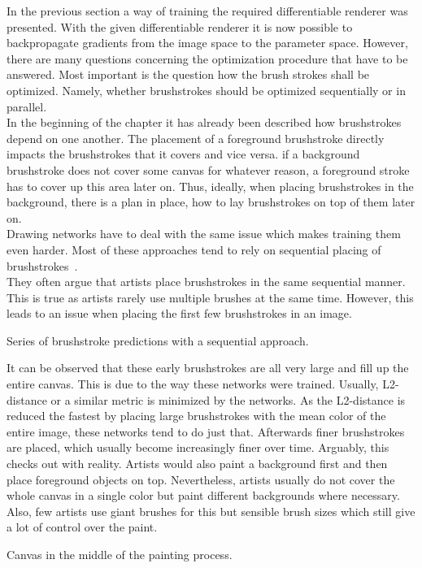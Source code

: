 In the previous section a way of training the required differentiable renderer was presented.
With the given differentiable renderer it is now possible to backpropagate gradients from the image space to the parameter space.
However, there are many questions concerning the optimization procedure that have to be answered.
Most important is the question how the brush strokes shall be optimized.
Namely, whether brushstrokes should be optimized sequentially or in parallel.\\
In the beginning of the chapter it has already been described how brushstrokes depend on one another.
The placement of a foreground brushstroke directly impacts the brushstrokes that it covers and vice versa.
\eg if a background brushstroke does not cover some canvas for whatever reason, a foreground stroke has to cover up this area later on.
Thus, ideally, when placing brushstrokes in the background, there is a plan in place, how to lay brushstrokes on top of them later on.\\
Drawing networks have to deal with the same issue which makes training them even harder.
Most of these approaches tend to rely on sequential placing of brushstrokes~\cite{SPIRAL, strokenet, learning2paint, neuralpainters, hertzmann}.\\
They often argue that artists place brushstrokes in the same sequential manner.
This is true as artists rarely use multiple brushes at the same time.
However, this leads to an issue when placing the first few brushstrokes in an image.\\
\begin{marginfigure}
    \caption{Series of brushstroke predictions with a sequential approach.}
\end{marginfigure}
It can be observed that these early brushstrokes are all very large and fill up the entire canvas.
This is due to the way these networks were trained.
Usually, L2-distance or a similar metric is minimized by the networks.
As the L2-distance is reduced the fastest by placing large brushstrokes with the mean color of the entire image, these networks tend to do just that.
Afterwards finer brushstrokes are placed, which usually become increasingly finer over time.
Arguably, this checks out with reality.
Artists would also paint a background first and then place foreground objects on top.
Nevertheless, artists usually do not cover the whole canvas in a single color but paint different backgrounds where necessary.
Also, few artists use giant brushes for this but sensible brush sizes which still give a lot of control over the paint.
\begin{marginfigure}
    \caption{Canvas in the middle of the painting process.}
\end{marginfigure}

